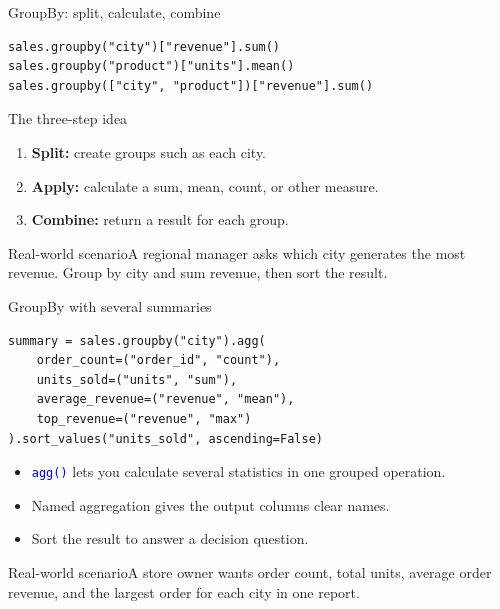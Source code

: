 \documentclass[aspectratio=169,10pt]{beamer}
\newcommand{\scenario}[1]{\begin{block}{Real-world scenario}#1\end{block}}
\newcommand{\method}[1]{\texttt{\textcolor{Blue}{#1}}}
\begin{document}
\begin{frame}[fragile]{GroupBy: split, calculate, combine}
\begin{lstlisting}
sales.groupby("city")["revenue"].sum()
sales.groupby("product")["units"].mean()
sales.groupby(["city", "product"])["revenue"].sum()
\end{lstlisting}
\begin{block}{The three-step idea}
\begin{enumerate}
\item \textbf{Split:} create groups such as each city.
\item \textbf{Apply:} calculate a sum, mean, count, or other measure.
\item \textbf{Combine:} return a result for each group.
\end{enumerate}
\end{block}
\scenario{A regional manager asks which city generates the most revenue. Group by city and sum revenue, then sort the result.}
\end{frame}

\begin{frame}[fragile]{GroupBy with several summaries}
\begin{lstlisting}
summary = sales.groupby("city").agg(
    order_count=("order_id", "count"),
    units_sold=("units", "sum"),
    average_revenue=("revenue", "mean"),
    top_revenue=("revenue", "max")
).sort_values("units_sold", ascending=False)
\end{lstlisting}
\begin{itemize}
\item \method{agg()} lets you calculate several statistics in one grouped operation.
\item Named aggregation gives the output columns clear names.
\item Sort the result to answer a decision question.
\end{itemize}
\scenario{A store owner wants order count, total units, average order revenue, and the largest order for each city in one report.}
\end{frame}
\end{document}
